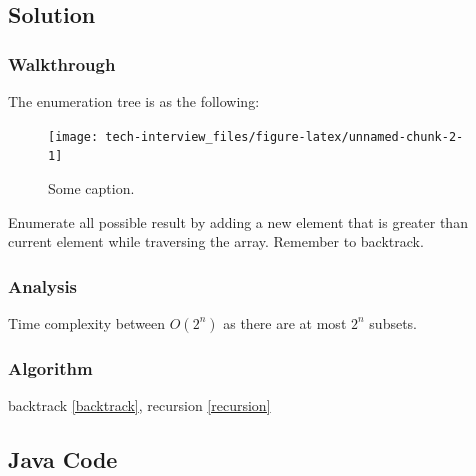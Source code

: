 \documentclass[]{book}
\begin{document}
\hypertarget{solution-11}{%
\subsection{Solution}\label{solution-11}}

\hypertarget{walkthrough-15}{%
\subsubsection{Walkthrough}\label{walkthrough-15}}

The enumeration tree is as the following:

\begin{figure}
\texttt{[image: tech-interview\_files/figure-latex/unnamed-chunk-2-1]} \caption{Some caption.}\label{fig:unnamed-chunk-2}
\end{figure}

Enumerate all possible result by adding a new element that is greater than current element while traversing the array.
Remember to backtrack.

\hypertarget{analysis-17}{%
\subsubsection{Analysis}\label{analysis-17}}

Time complexity between \(O(2^{n})\) as there are at most \(2^n\) subsets.

\hypertarget{algorithm-17}{%
\subsubsection{Algorithm}\label{algorithm-17}}

backtrack \ref{backtrack}, recursion \ref{recursion}

\hypertarget{java-code-13}{%
\subsection{Java Code}\label{java-code-13}}
\end{document}
